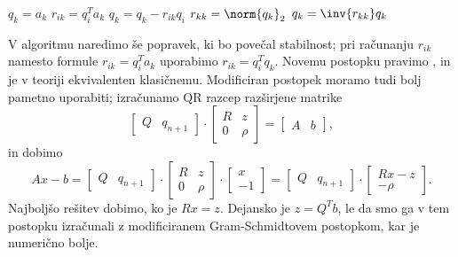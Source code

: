 \begin{algorithm}
  \caption{QR razcep s klasičnim Gram-Schmidtovim postopkom}
  \label{alg:qr-gram-schmitt}
  \begin{algorithmic}
	\State $q_k = a_k$
	\State $r_{ik} = q_i^T a_k$
	\State $q_k = q_k - r_{ik} q_i$
	\EndFor
	\State $r_{kk} = \norm{q_k}_2$
	\State $q_k = \inv{r_{kk}} q_k$
	\EndFor
  \end{algorithmic}
\end{algorithm}


V algoritmu naredimo še popravek, ki bo povečal stabilnost; pri računanju
$r_{ik}$ namesto formule $r_{ik} = q_i^T a_k$ uporabimo $r_{ik} = q_i^T q_k$.
Novemu postopku pravimo , in je v teoriji
ekvivalenten klasičnemu.
Modificiran postopek moramo tudi bolj pametno uporabiti; izračunamo QR razcep
razširjene matrike
\[
  \begin{bmatrix}
	Q & q_{n+1}
  \end{bmatrix}
  \cdot
  \begin{bmatrix}
	R & z \\ 0 & \rho
  \end{bmatrix}
  =
  \begin{bmatrix}
	A & b
  \end{bmatrix},
\]
in dobimo
\[
  Ax - b =
  \begin{bmatrix}
	Q & q_{n+1}
  \end{bmatrix}
  \cdot
  \begin{bmatrix}
	R & z \\ 0 & \rho
  \end{bmatrix}
  \cdot
  \begin{bmatrix}
	x \\ -1
  \end{bmatrix}
  =
  \begin{bmatrix}
	Q & q_{n+1}
  \end{bmatrix}
  \cdot
  \begin{bmatrix}
	Rx - z \\ -\rho
  \end{bmatrix}.
\]
Najboljšo rešitev dobimo, ko je $Rx = z$.
Dejansko je $z = Q^T b$, le da smo ga v tem postopku izračunali z modificiranem
Gram-Schmidtovem postopkom, kar je numerično bolje.


